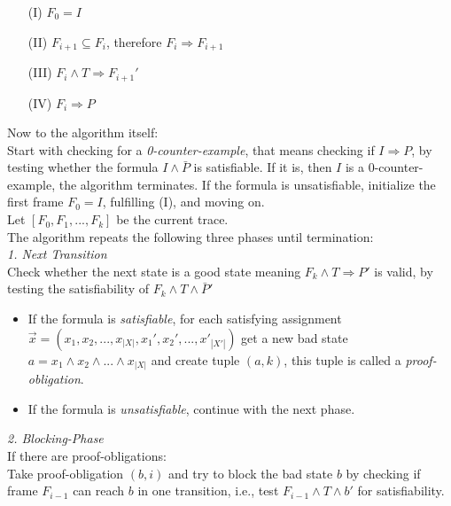 \documentclass[11pt, a4paper, BCOR=10mm, ngerman, oneside]{scrbook}
\begin{document}
\begin{itemize}
\item[(I)] $F_0 = I$
\item[(II)] $F_{i+1} \subseteq F_{i}$, therefore $F_i \Rightarrow F_{i+1}$
\item[(III)] $F_i \land T \Rightarrow F_{i+1}'$
\item[(IV)] $F_i \Rightarrow P$
\end{itemize}

Now to the algorithm itself: \\
Start with checking for a \textsl{0-counter-example}, that means checking if $I \Rightarrow P$, by testing whether the formula $I \land \bar P$ is satisfiable. If it is, then $I$ is a 0-counter-example, the algorithm terminates.
If the formula is unsatisfiable, initialize the first frame $F_0 = I$, fulfilling (I), and moving on. \\

Let $[F_0, F_1, ..., F_k]$ be the current trace. \\ 
The algorithm repeats the following three phases until termination: \\

\textsl{1. Next Transition} \\ Check whether the next state is a good state meaning $F_k \land T \Rightarrow P'$ is valid, by testing the satisfiability of $F_k \land T \land \bar P'$ 
\begin{itemize}
\item If the formula is \textsl{satisfiable}, for each satisfying assignment \\ $\vec{x} = (x_1, x_2, ..., x_{|X|}, x_1', x_2', ..., x'_{|X'|})$ get a new bad state \\ $a = x_1 \land x_2 \land ... \land x_{|X|}$ and create tuple $(a, k)$, this tuple is called a \textsl{proof-obligation}.

\item If the formula is \textsl{unsatisfiable}, continue with the next phase. \\

\end{itemize}


\textsl{2. Blocking-Phase} \\If there are proof-obligations: \\ 
Take proof-obligation $(b, i)$ and try to block the bad state $b$ by checking if frame $F_{i-1}$ can reach $b$ in one transition, i.e., test $F_{i-1} \land T \land b'$ for satisfiability.
\end{document}

